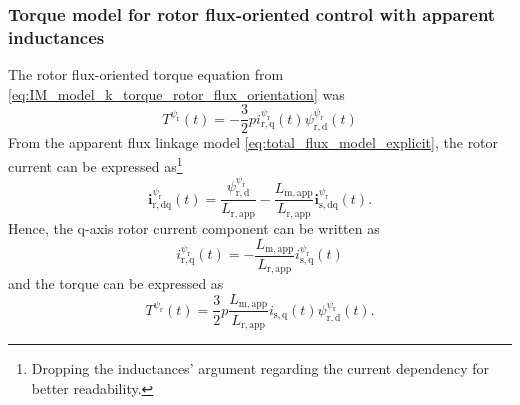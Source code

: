 \begin{frame}
    \frametitle{Torque model for rotor flux-oriented control with apparent inductances}
    The rotor flux-oriented torque equation from \eqref{eq:IM_model_k_torque_rotor_flux_orientation} was
    \begin{equation*}
        T^{\psi_{\mathrm{r}}}(t)  = -\frac{3}{2} p i_{\mathrm{r,q}}^{\psi_{\mathrm{r}}}(t)\psi_{\mathrm{r,d}}^{\psi_{\mathrm{r}}}(t)
    \end{equation*}\pause%
    From the apparent flux linkage model \eqref{eq:total_flux_model_explicit}, the rotor current can be expressed as\footnote{Dropping the inductances' argument regarding the current dependency for better readability.}
    \begin{equation}
        \bm{i}_{\mathrm{r,dq}}^{\psi_{\mathrm{r}}}(t)
        = \frac{\psi_{\mathrm{r,d}}^{\psi_{\mathrm{r}}}}{L_\mathrm{r,app}} - \frac{L_\mathrm{m,app}}{L_\mathrm{r,app}} \bm{i}^{\psi_{\mathrm{r}}}_{\mathrm{s,dq}}(t).
    \end{equation}\pause%
    Hence, the $\mathrm{q}$-axis rotor current component can be written as
    $$
        i_{\mathrm{r,q}}^{\psi_{\mathrm{r}}}(t) = - \frac{L_\mathrm{m,app}}{L_\mathrm{r,app}} i^{\psi_{\mathrm{r}}}_{\mathrm{s,q}}(t)
    $$\pause%
    and the torque can be expressed as
    \begin{equation}
        T^{\psi_{\mathrm{r}}}(t)=\frac{3}{2} p \frac{L_\mathrm{m,app}}{L_\mathrm{r,app}} i_{\mathrm{s,q}}(t)\psi_{\mathrm{r,d}}^{\psi_{\mathrm{r}}}(t).
    \end{equation}
\end{frame}


